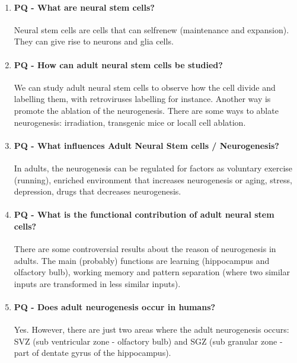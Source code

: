 \documentclass[12pt,article,oneside,a4paper]{memoir}
\begin{document}
\begin{enumerate}
\item \paragraph{PQ - What are neural stem cells?}
Neural stem cells are cells that can self­renew (maintenance and expansion). They can give rise to neurons and glia cells.

\item \paragraph{PQ - How can adult neural stem cells be studied?} We can study adult neural stem cells to observe how the cell divide and labelling them, with retroviruses labelling for instance. Another way is promote the ablation of the neurogenesis. There are some ways to ablate neurogenesis: irradiation, transgenic mice or locall cell ablation.

\item \paragraph{PQ - What influences Adult Neural Stem cells / Neurogenesis?}
In adults, the neurogenesis can be regulated for factors as voluntary exercise (running), enriched environment that increases neurogenesis or aging, stress, depression, drugs that decreases neurogenesis.

\item \paragraph{PQ - What is the functional contribution of adult neural stem cells?}
There are some controversial results about the reason of neurogenesis in adults. The main (probably) functions are learning (hippocampus and olfactory bulb), working memory and pattern separation (where two similar inputs are transformed in less similar inputs).

\item \paragraph{PQ - Does adult neurogenesis occur in humans?}
Yes. However, there are just two areas where the adult neurogenesis occurs: SVZ (sub ventricular zone - olfactory bulb) and SGZ (sub granular zone - part of dentate gyrus of the hippocampus).


\end{enumerate}
\end{document}

